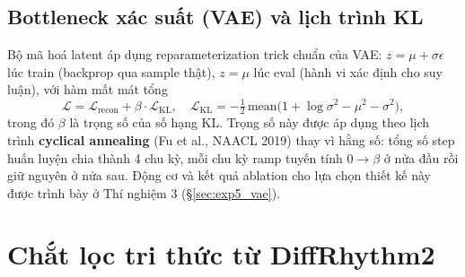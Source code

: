 \documentclass[a4paper,13pt,oneside]{report}
\begin{document}
\subsection{Bottleneck xác suất (VAE) và lịch trình KL}
\label{sec:vae_bottleneck}

Bộ mã hoá latent áp dụng reparameterization trick chuẩn của VAE:
$z=\mu+\sigma\epsilon$ lúc train (backprop qua sample thật), $z=\mu$ lúc eval (hành vi xác
định cho suy luận), với hàm mất mát tổng
\begin{equation}
 \mathcal{L} = \mathcal{L}_{\text{recon}} + \beta\cdot\mathcal{L}_{\mathrm{KL}},
 \quad \mathcal{L}_{\mathrm{KL}}=-\tfrac12\,\mathrm{mean}\big(1+\log\sigma^2-\mu^2-\sigma^2\big),
\end{equation}
trong đó $\beta$ là trọng số của số hạng KL. Trọng số này được áp dụng theo lịch trình \textbf{cyclical annealing} (Fu
et al., NAACL 2019) thay vì hằng số: tổng số step huấn luyện chia thành 4 chu kỳ, mỗi chu
kỳ ramp tuyến tính $0\to\beta$ ở nửa đầu rồi giữ nguyên ở nửa sau. Động cơ và
kết quả ablation cho lựa chọn thiết kế này được trình bày ở Thí nghiệm 3
(\S\ref{sec:exp5_vae}).

\section{Chắt lọc tri thức từ DiffRhythm2}
\label{sec:distillation_chapter}
\end{document}
